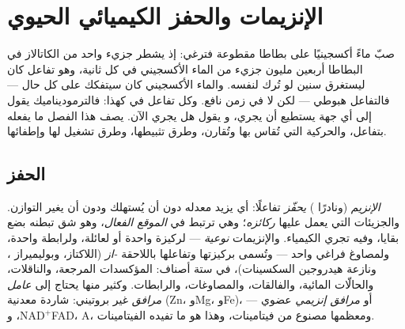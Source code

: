 \chapter{الإنزيمات والحفز الكيميائي الحيوي}\label{ch:b1:enzymes}

صبّ ماءً أكسجينيًا على بطاطا مقطوعة فترغي: إذ يشطر جزيء واحد من
الكاتالاز في  البطاطا أربعين مليون جزيء من الماء الأكسجيني في كل
ثانية، وهو تفاعل كان ليستغرق سنين لو تُرك لنفسه. والماء الأكسجيني كان
سيتفكك على كل حال --- فالتفاعل هبوطي --- لكن لا في زمن نافع. وكل
تفاعل في  كهذا: فالترموديناميك يقول إلى أي جهة يستطيع أن يجري،
و\emph{} يقول هل يجري الآن. يصف هذا الفصل ما يفعله 
بتفاعل، والحركية التي تُقاس بها  وتُقارن، وطرق تثبيطها،
وطرق تشغيل  لها وإطفائها.

\section{الحفز}

\begin{definition}\label{def:b1:enzymes:enzyme}
\emph{الإنزيم}  (ونادرًا ) \emph{يحفّز}
تفاعلًا: أي يزيد معدله دون أن يُستهلك ودون أن يغير التوازن.
والجزيئات التي يعمل عليها \emph{ركائزه}؛ وهي ترتبط في
\emph{الموقع الفعال}، وهو شق تبطنه بضع بقايا،
وفيه تجري الكيمياء. والإنزيمات \emph{نوعية} --- لركيزة واحدة أو
لعائلة، ولرابطة واحدة، ولمصاوغ فراغي واحد --- وتُسمى بركيزتها
وتفاعلها باللاحقة \emph{-از} (اللاكتاز، وبوليميراز ، ونازعة
هيدروجين السكسينات)، في ستة أصناف: المؤكسدات المرجعة، والناقلات،
والحالّات المائية، والفالقات، والمصاوغات، والرابطات. وكثير منها يحتاج
إلى \emph{عامل مرافق} غير بروتيني: شاردة معدنية
(Zn، وMg، وFe)، أو \emph{مرافق إنزيمي} عضوي ---
$\mathrm{NAD^+}$، وFAD،  A، ومعظمها مصنوع من فيتامينات، وهذا
هو ما تفيده الفيتامينات.
\end{definition}

